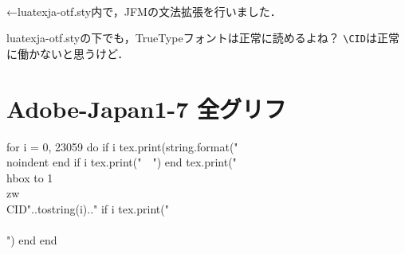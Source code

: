 \documentclass{ltjsarticle}
\begin{document}
\hbox{\tate
  }


←luatexja-otf.sty内で，JFMの文法拡張を行いました．


{
\selectfont
luatexja-otf.styの下でも，TrueTypeフォントは正常に読めるよね？
\verb+\CID+は正常に働かないと思うけど．}

\newpage

\section*{Adobe-Japan1-7 全グリフ}

{\footnotesize
\begin{luacode*}
for i = 0, 23059 do
   if i %
      tex.print(string.format("\\noindent%
   end
   if i %
      tex.print("　")
   end
   tex.print("\\hbox to 1\\zw{\\CID{"..tostring(i).."}}%
   if i %
      tex.print("\\\\")
   end
end
\end{luacode*}
}
\end{document}
